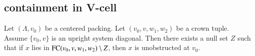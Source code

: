 \subsection{containment in V-cell}

%
%
%
%
%




\begin{lemma}
Let $(\Lambda,v_0)$ be a centered packing.  Let $(v_0,v,w_1,w_2)$
be a crown tuple.
Assume $\{v_0,v\}$ is an upright system diagonal.
Then there exists a null set $Z$ such that if $x$ lies in %
${\operatorname{FC}}(v_0,v,w_1,w_2)\setminus Z$,
then $x$ is unobstructed at $v_0$.
\end{lemma}

